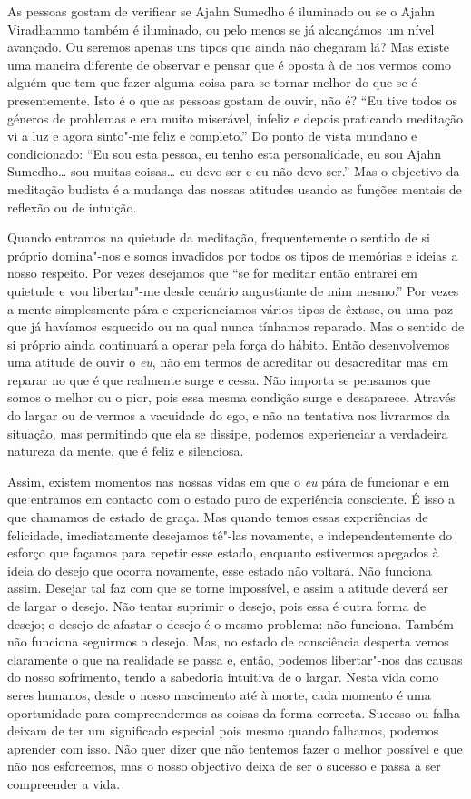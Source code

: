 As pessoas gostam de verificar se Ajahn Sumedho é iluminado ou se o
Ajahn Viradhammo também é iluminado, ou pelo menos se já alcançámos um
nível avançado. Ou seremos apenas uns tipos que ainda não chegaram lá?
Mas existe uma maneira diferente de observar e pensar que é oposta à de
nos vermos como alguém que tem que fazer alguma coisa para se tornar
melhor do que se é presentemente. Isto é o que as pessoas gostam de
ouvir, não é? ``Eu tive todos os géneros de problemas e era muito
miserável, infeliz e depois praticando meditação vi a luz e agora
sinto"-me feliz e completo.'' Do ponto de vista mundano e condicionado:
``Eu sou esta pessoa, eu tenho esta personalidade, eu sou Ajahn
Sumedho\ldots{} sou muitas coisas\ldots{} eu devo ser e eu não devo ser.'' Mas o
objectivo da meditação budista é a mudança das nossas atitudes usando as
funções mentais de reflexão ou de intuição.

Quando entramos na quietude da meditação, frequentemente o sentido de si
próprio domina"-nos e somos invadidos por todos os tipos de memórias e
ideias a nosso respeito. Por vezes desejamos que ``se for meditar então
entrarei em quietude e vou libertar"-me desde cenário angustiante de mim
mesmo.'' Por vezes a mente simplesmente pára e experienciamos vários
tipos de êxtase, ou uma paz que já havíamos esquecido ou na qual nunca
tínhamos reparado. Mas o sentido de si próprio ainda continuará a operar
pela força do hábito. Então desenvolvemos uma atitude de ouvir o
\emph{eu}, não em termos de acreditar ou desacreditar mas em reparar no
que é que realmente surge e cessa. Não importa se pensamos que somos o
melhor ou o pior, pois essa mesma condição surge e desaparece. Através
do largar ou de vermos a vacuidade do ego, e não na tentativa nos
livrarmos da situação, mas permitindo que ela se dissipe, podemos
experienciar a verdadeira natureza da mente, que é feliz e silenciosa.

Assim, existem momentos nas nossas vidas em que o \emph{eu} pára de
funcionar e em que entramos em contacto com o estado puro de experiência
consciente. É isso a que chamamos de estado de graça. Mas quando temos
essas experiências de felicidade, imediatamente desejamos tê"-las
novamente, e independentemente do esforço que façamos para repetir esse
estado, enquanto estivermos apegados à ideia do desejo que ocorra
novamente, esse estado não voltará. Não funciona assim. Desejar tal faz
com que se torne impossível, e assim a atitude deverá ser de largar o
desejo. Não tentar suprimir o desejo, pois essa é outra forma de desejo;
o desejo de afastar o desejo é o mesmo problema: não funciona. Também
não funciona seguirmos o desejo. Mas, no estado de consciência desperta
vemos claramente o que na realidade se passa e, então, podemos
libertar"-nos das causas do nosso sofrimento, tendo a sabedoria intuitiva
de o largar. Nesta vida como seres humanos, desde o nosso nascimento até
à morte, cada momento é uma oportunidade para compreendermos as coisas
da forma correcta. Sucesso ou falha deixam de ter um significado
especial pois mesmo quando falhamos, podemos aprender com isso. Não quer
dizer que não tentemos fazer o melhor possível e que não nos esforcemos,
mas o nosso objectivo deixa de ser o sucesso e passa a ser compreender a
vida.

